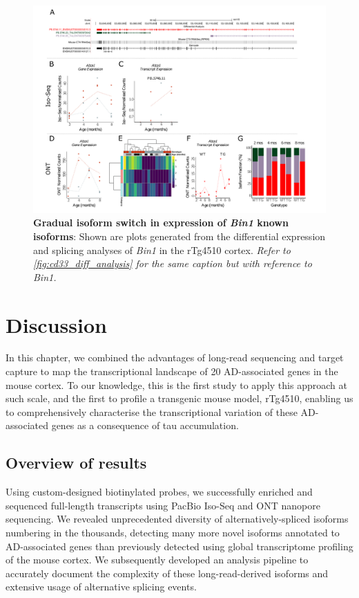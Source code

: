 \begin{landscape}
	\begin{figure}[htp]
		\begin{center}
			\includegraphics[page=6,trim={0 0.5cm 0 1.5cm},scale =0.85]{Figures/TargetGene_DifferentialAnalysis.pdf}
		\end{center}
		\captionsetup{width=1.5\textwidth}
		\caption[Differential \textit{Bin1} transcript expression and usage]%
		{\textbf{Gradual isoform switch in expression of \textit{Bin1} known isoforms}: Shown are plots generated from the differential expression and splicing analyses of \textit{Bin1} in the rTg4510 cortex. \textit{Refer to \cref{fig:cd33_diff_analysis} for the same caption but with reference to \textit{Bin1}.}}   
		\label{fig:bin1_diff_analysis}
	\end{figure}
\end{landscape}



\newpage
\section{Discussion}
In this chapter, we combined the advantages of long-read sequencing and target capture to map the transcriptional landscape of 20 AD-associated genes in the mouse cortex. To our knowledge, this is the first study to apply this approach at such scale, and the first to profile a transgenic mouse model, rTg4510, enabling us to comprehensively characterise the transcriptional variation of these AD-associated genes as a consequence of tau accumulation.

\subsection{Overview of results}
Using custom-designed biotinylated probes, we successfully enriched and sequenced full-length transcripts using PacBio Iso-Seq and ONT nanopore sequencing. We revealed unprecedented diversity of alternatively-spliced isoforms numbering in the thousands, detecting many more novel isoforms annotated to AD-associated genes than previously detected using global transcriptome profiling of the mouse cortex. We subsequently developed an analysis pipeline to accurately document the complexity of these long-read-derived isoforms and extensive usage of alternative splicing events. 

